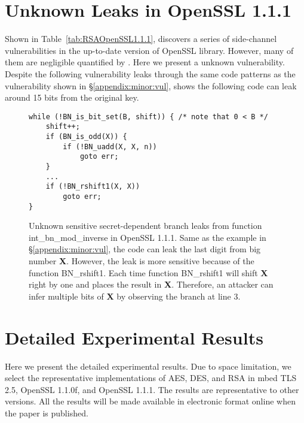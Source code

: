 \section{Unknown Leaks in OpenSSL 1.1.1}
Shown in Table~\ref{tab:RSAOpenSSL1.1.1}, \tool{} discovers a series
of side-channel vulnerabilities in the up-to-date version of OpenSSL library. 
However, many of them are negligible quantified by \tool{}.
Here we present a unknown vulnerability. Despite the following
vulnerability leaks through the same code patterns as the vulnerability shown
in \S\ref{appendix:minor:vul}, \tool{} shows the following code can leak
around 15 bits from the original key.
\label{appendix:unknown}
\begin{figure}[h]
\centering
\begin{lstlisting}[xleftmargin=.02\textwidth,xrightmargin=.01\textwidth]
while (!BN_is_bit_set(B, shift)) { /* note that 0 < B */
    shift++;
    if (BN_is_odd(X)) {
        if (!BN_uadd(X, X, n))
            goto err;
    }
    ...
    if (!BN_rshift1(X, X))
        goto err;
}

\end{lstlisting}
    \vspace*{-6pt}
    \caption{Unknown sensitive secret-dependent branch leaks from function 
             \textsf{int\_bn\_mod\_inverse} in OpenSSL 1.1.1. Same as the example
             in \S\ref{appendix:minor:vul}, the code can leak the last digit from
             big number \textbf{X}. However, the leak is more sensitive because of the 
             function \textsf{BN\_rshift1}. Each time function \textsf{BN\_rshift1}
             will shift \textbf{X} right by one and places the result in \textbf{X}. Therefore,
             an attacker can infer multiple bits of \textbf{X} by observing the branch at line 3.}
    \label{fig:unknown}
    \vspace*{-6pt}
\end{figure}

\section{Detailed Experimental Results}
\label{sec:result-table}

Here we present the detailed experimental results.
Due to space limitation, we select the representative implementations of
AES, DES, and RSA in
mbed TLS 2.5,
OpenSSL 1.1.0f,  and
OpenSSL 1.1.1.  
The results are representative to other versions.
All the results will be made available in electronic format online
when the paper is published. %

